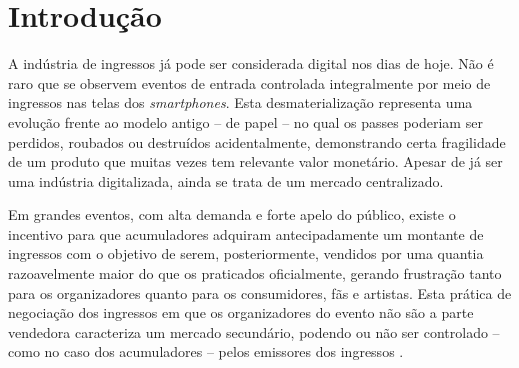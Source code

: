 \section{\esp Introdução}

A indústria de ingressos já pode ser considerada digital nos dias de hoje. Não é raro que se observem eventos de entrada controlada integralmente por meio de ingressos nas telas dos \textit{smartphones}. Esta desmaterialização representa uma evolução frente ao modelo antigo -- de papel -- no qual os passes poderiam ser perdidos, roubados ou destruídos acidentalmente, demonstrando certa fragilidade de um produto que muitas vezes tem relevante valor monetário. Apesar de já ser uma indústria digitalizada, ainda se trata de um mercado centralizado.


Em grandes eventos, com alta demanda e forte apelo do público, existe o incentivo para que acumuladores adquiram antecipadamente um montante de ingressos com o objetivo de serem, posteriormente, vendidos por uma quantia razoavelmente maior do que os praticados oficialmente, gerando frustração tanto para os organizadores quanto para os consumidores, fãs e artistas. Esta prática de negociação dos ingressos em que os organizadores do evento não são a parte vendedora caracteriza um mercado secundário, podendo ou não ser controlado -- como no caso dos acumuladores -- pelos emissores dos ingressos \cite{singer2019golden}.

